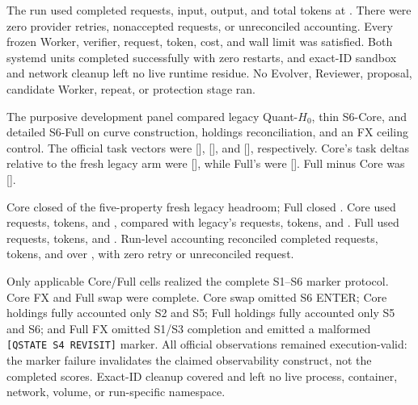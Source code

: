 The run used \EvtPotHZeroRequests{} completed requests,
\EvtPotHZeroInputTokens{} input, \EvtPotHZeroOutputTokens{} output, and
\EvtPotHZeroTotalTokens{} total tokens at \EvtPotHZeroCost{}. There were zero
provider retries, nonaccepted requests, or unreconciled accounting. Every
frozen Worker, verifier, request, token, cost, and wall limit was satisfied.
Both systemd units completed successfully with zero restarts, and exact-ID
sandbox and network cleanup left no live runtime residue. No Evolver,
Reviewer, proposal, candidate Worker, repeat, or protection stage ran.


 The purposive development panel compared legacy
Quant-$H_0$, thin S6-Core, and detailed S6-Full on curve construction,
holdings reconciliation, and an FX ceiling control. The official task vectors
were [\SsixCanaryLegacyVector{}], [\SsixCanaryCoreVector{}], and
[\SsixCanaryFullVector{}], respectively. Core's task deltas relative to the
fresh legacy arm were [\SsixCanaryCoreDelta{}], while Full's were
[\SsixCanaryFullDelta{}]. Full minus Core was
[\SsixCanaryFullMinusCore{}].

Core closed \SsixCanaryCoreHeadroom{} of the five-property fresh legacy
headroom; Full closed \SsixCanaryFullHeadroom{}. Core used
\SsixCanaryCoreRequests{} requests, \SsixCanaryCoreTokens{} tokens, and
\SsixCanaryCoreCost{}, compared with legacy's
\SsixCanaryLegacyRequests{} requests, \SsixCanaryLegacyTokens{} tokens, and
\SsixCanaryLegacyCost{}. Full used \SsixCanaryFullRequests{} requests,
\SsixCanaryFullTokens{} tokens, and \SsixCanaryFullCost{}. Run-level
accounting reconciled \SsixCanaryRequests{} completed requests,
\SsixCanaryTokens{} tokens, and \SsixCanaryCost{} over
\SsixCanaryWall{}, with zero retry or unreconciled request.

Only \SsixCanaryProtocolComplete{} applicable Core/Full cells realized the
complete S1--S6 marker protocol. Core FX and Full swap were complete. Core
swap omitted S6 ENTER; Core holdings fully accounted only S2 and S5; Full
holdings fully accounted only S5 and S6; and Full FX omitted S1/S3 completion
and emitted a malformed \texttt{[QSTATE S4 REVISIT]} marker. All official
observations remained execution-valid: the marker failure invalidates the
claimed observability construct, not the completed scores. Exact-ID cleanup
covered \SsixCanaryCleanup{} and left no live process, container, network,
volume, or run-specific namespace.

